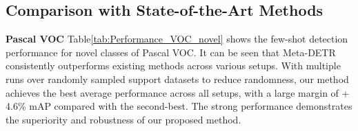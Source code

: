 \documentclass[letterpaper]{article} \usepackage{aaai22}  \usepackage{times}  \usepackage{helvet}  \usepackage{courier}  \usepackage[hyphens]{url}  \usepackage{graphicx} \urlstyle{rm} \def\UrlFont{\rm}  \usepackage{natbib}  \usepackage{caption} \DeclareCaptionStyle{ruled}{labelfont=normalfont,labelsep=colon,strut=off} \frenchspacing  \setlength{\pdfpagewidth}{8.5in}  \setlength{\pdfpageheight}{11in}  \usepackage{algorithm}
\begin{document}
\subsection{Comparison with State-of-the-Art Methods}

\noindent\textbf{Pascal VOC\;\;}
Table\;\ref{tab:Performance_VOC_novel} shows the few-shot detection performance for novel classes of Pascal VOC. It can be seen that Meta-DETR consistently outperforms existing methods across various setups. With multiple runs over randomly sampled support datasets to reduce randomness, our method achieves the best average performance across all setups, with a large margin of +\,4.6\% mAP compared with the second-best. The strong performance demonstrates the superiority and robustness of our proposed method.
\end{document}
